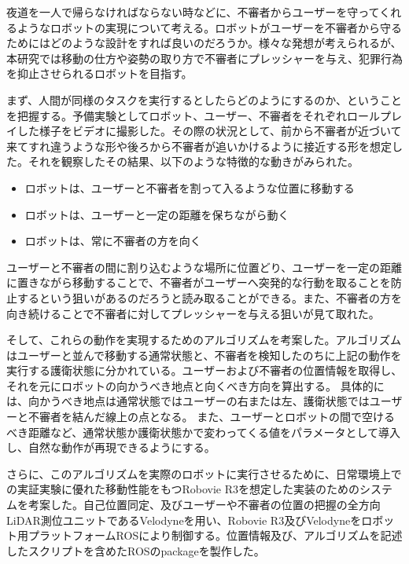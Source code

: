 \documentclass{kuisthesis}
\date{平成31年2月8日}				%
\begin{document}
\maketitle

\begin{jabstract}
夜道を一人で帰らなければならない時などに、不審者からユーザーを守ってくれるようなロボットの実現について考える。ロボットがユーザーを不審者から守るためにはどのような設計をすれば良いのだろうか。様々な発想が考えられるが、本研究では移動の仕方や姿勢の取り方で不審者にプレッシャーを与え、犯罪行為を抑止させられるロボットを目指す。

まず、人間が同様のタスクを実行するとしたらどのようにするのか、ということを把握する。予備実験としてロボット、ユーザー、不審者をそれぞれロールプレイした様子をビデオに撮影した。その際の状況として、前から不審者が近づいて来てすれ違うような形や後ろから不審者が追いかけるように接近する形を想定した。それを観察したその結果、以下のような特徴的な動きがみられた。

\begin{itemize}
\item ロボットは、ユーザーと不審者を割って入るような位置に移動する
\item ロボットは、ユーザーと一定の距離を保ちながら動く
\item ロボットは、常に不審者の方を向く
\end{itemize}

ユーザーと不審者の間に割り込むような場所に位置どり、ユーザーを一定の距離に置きながら移動することで、不審者がユーザーへ突発的な行動を取ることを防止するという狙いがあるのだろうと読み取ることができる。また、不審者の方を向き続けることで不審者に対してプレッシャーを与える狙いが見て取れた。

そして、これらの動作を実現するためのアルゴリズムを考案した。アルゴリズムはユーザーと並んで移動する通常状態と、不審者を検知したのちに上記の動作を実行する護衛状態に分かれている。ユーザーおよび不審者の位置情報を取得し、それを元にロボットの向かうべき地点と向くべき方向を算出する。
具体的には、向かうべき地点は通常状態ではユーザーの右または左、護衛状態ではユーザーと不審者を結んだ線上の点となる。
また、ユーザーとロボットの間で空けるべき距離など、通常状態か護衛状態かで変わってくる値をパラメータとして導入し、自然な動作が再現できるようにする。

さらに、このアルゴリズムを実際のロボットに実行させるために、日常環境上での実証実験に優れた移動性能をもつRobovie R3を想定した実装のためのシステムを考案した。自己位置同定、及びユーザーや不審者の位置の把握の全方向LiDAR測位ユニットであるVelodyneを用い、Robovie R3及びVelodyneをロボット用プラットフォームROSにより制御する。位置情報及び、アルゴリズムを記述したスクリプトを含めたROSのpackageを製作した。


\end{jabstract}
\end{document}
